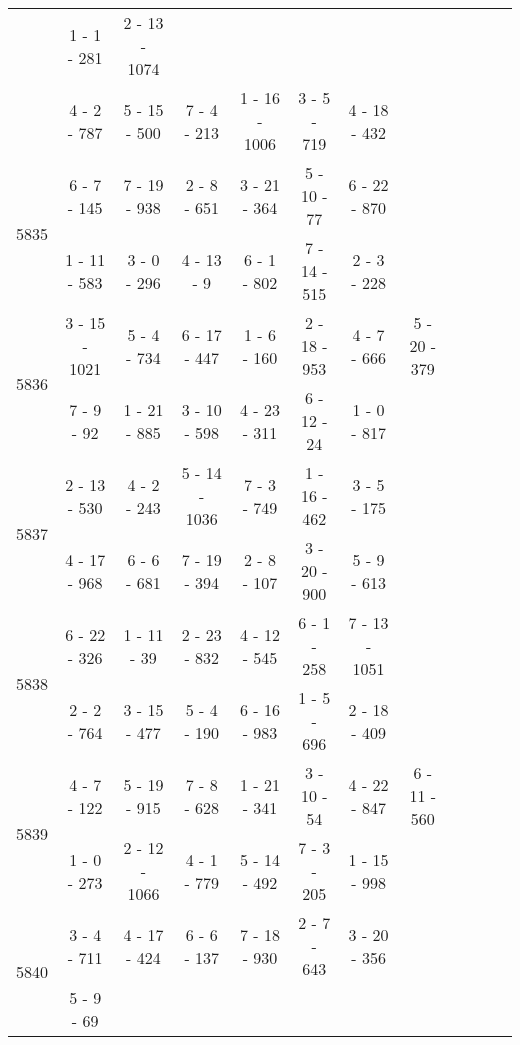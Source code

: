 \begin{longtable}{c | c | c | c | c | c | c | c | c | c | c | c}
&
1 - 1 - 281
&
2 - 13 - 1074
&\space\\* \space
&
4 - 2 - 787
&
5 - 15 - 500
&
7 - 4 - 213
&
1 - 16 - 1006
&
3 - 5 - 719
&
4 - 18 - 432
&\space\\\hline
\multirow{2}{*}{5835}
& 6 - 7 - 145
&
7 - 19 - 938
&
2 - 8 - 651
&
3 - 21 - 364
&
5 - 10 - 77
&
6 - 22 - 870
&\space\\* \space
&
1 - 11 - 583
&
3 - 0 - 296
&
4 - 13 - 9
&
6 - 1 - 802
&
7 - 14 - 515
&
2 - 3 - 228
&\space\\\hline
\multirow{2}{*}{5836}
& 3 - 15 - 1021
&
5 - 4 - 734
&
6 - 17 - 447
&
1 - 6 - 160
&
2 - 18 - 953
&
4 - 7 - 666
&
5 - 20 - 379
\\* \space
&
7 - 9 - 92
&
1 - 21 - 885
&
3 - 10 - 598
&
4 - 23 - 311
&
6 - 12 - 24
&
1 - 0 - 817
&\space\\\hline
\multirow{2}{*}{5837}
& 2 - 13 - 530
&
4 - 2 - 243
&
5 - 14 - 1036
&
7 - 3 - 749
&
1 - 16 - 462
&
3 - 5 - 175
&\space\\* \space
&
4 - 17 - 968
&
6 - 6 - 681
&
7 - 19 - 394
&
2 - 8 - 107
&
3 - 20 - 900
&
5 - 9 - 613
&\space\\\hline
\multirow{2}{*}{5838}
& 6 - 22 - 326
&
1 - 11 - 39
&
2 - 23 - 832
&
4 - 12 - 545
&
6 - 1 - 258
&
7 - 13 - 1051
&\space\\* \space
&
2 - 2 - 764
&
3 - 15 - 477
&
5 - 4 - 190
&
6 - 16 - 983
&
1 - 5 - 696
&
2 - 18 - 409
&\space\\\hline
\multirow{2}{*}{5839}
& 4 - 7 - 122
&
5 - 19 - 915
&
7 - 8 - 628
&
1 - 21 - 341
&
3 - 10 - 54
&
4 - 22 - 847
&
6 - 11 - 560
\\* \space
&
1 - 0 - 273
&
2 - 12 - 1066
&
4 - 1 - 779
&
5 - 14 - 492
&
7 - 3 - 205
&
1 - 15 - 998
&\space\\\hline
\multirow{2}{*}{5840}
& 3 - 4 - 711
&
4 - 17 - 424
&
6 - 6 - 137
&
7 - 18 - 930
&
2 - 7 - 643
&
3 - 20 - 356
&\space\\* \space
&
5 - 9 - 69
&

\end{longtable}
